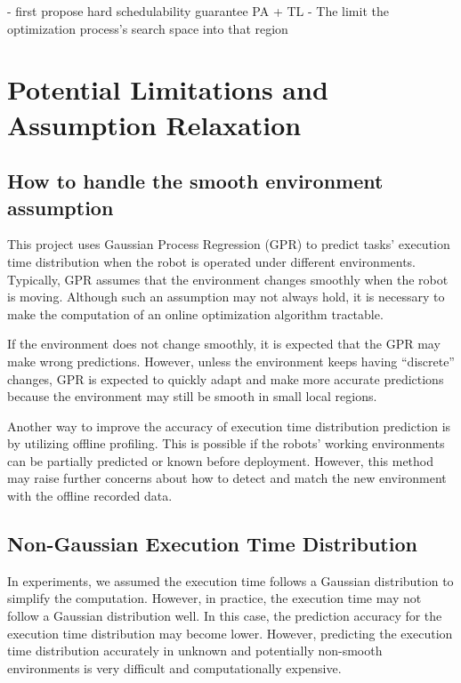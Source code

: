 - first propose hard schedulability guarantee PA + TL
- The limit the optimization process's search space into that region

\section{Potential Limitations and Assumption Relaxation}

    
    \subsection{How to handle the smooth environment assumption}
    \label{section: relax_smooth_assumption}
    
    This project uses Gaussian Process Regression (GPR) to predict tasks' execution time distribution when the robot is operated under different environments. 
    Typically, GPR assumes that the environment changes smoothly when the robot is moving. Although such an assumption may not always hold, it is necessary to make the computation of an online optimization algorithm tractable. 

    If the environment does not change smoothly, it is expected that the GPR may make wrong predictions. However, unless the environment keeps having ``discrete'' changes, GPR is expected to quickly adapt and make more accurate predictions because the environment may still be smooth in small local regions.

    Another way to improve the accuracy of execution time distribution prediction is by utilizing offline profiling. This is possible if the robots' working environments can be partially predicted or known before deployment. However, this method may raise further concerns about how to detect and match the new environment with the offline recorded data.
	\subsection{Non-Gaussian Execution Time Distribution}
    In experiments, we assumed the execution time follows a Gaussian distribution to simplify the computation. However, in practice, the execution time may not follow a Gaussian distribution well. In this case, the prediction accuracy for the execution time distribution may become lower.
    However, predicting the execution time distribution accurately in unknown and potentially non-smooth environments is very difficult and computationally expensive. 
	
